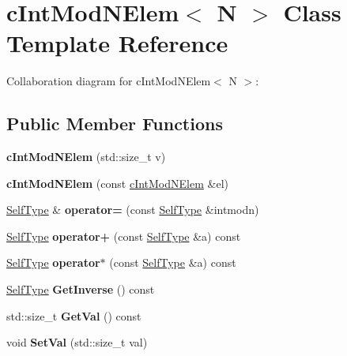 \hypertarget{classcIntModNElem}{\section{c\-Int\-Mod\-N\-Elem$<$ N $>$ Class Template Reference}
\label{classcIntModNElem}
}


Collaboration diagram for c\-Int\-Mod\-N\-Elem$<$ N $>$\-:
\subsection*{Public Member Functions}
\begin{DoxyCompactItemize}
\item 
\hypertarget{classcIntModNElem_a93be93aa382c5501b0f36322b24e93db}{{\bfseries c\-Int\-Mod\-N\-Elem} (std\-::size\-\_\-t v)}\label{classcIntModNElem_a93be93aa382c5501b0f36322b24e93db}

\item 
\hypertarget{classcIntModNElem_a878192260976d100695404d0bbc28484}{{\bfseries c\-Int\-Mod\-N\-Elem} (const \hyperlink{classcIntModNElem}{c\-Int\-Mod\-N\-Elem} \&el)}\label{classcIntModNElem_a878192260976d100695404d0bbc28484}

\item 
\hypertarget{classcIntModNElem_a0d0ae718c816556da6fcbf19454c676d}{\hyperlink{classcIntModNElem}{Self\-Type} \& {\bfseries operator=} (const \hyperlink{classcIntModNElem}{Self\-Type} \&intmodn)}\label{classcIntModNElem_a0d0ae718c816556da6fcbf19454c676d}

\item 
\hypertarget{classcIntModNElem_a10093e22457346b333e45f1414739497}{\hyperlink{classcIntModNElem}{Self\-Type} {\bfseries operator+} (const \hyperlink{classcIntModNElem}{Self\-Type} \&a) const }\label{classcIntModNElem_a10093e22457346b333e45f1414739497}

\item 
\hypertarget{classcIntModNElem_adff6836b0b7a20c50b6b9696aea66ca6}{\hyperlink{classcIntModNElem}{Self\-Type} {\bfseries operator$\ast$} (const \hyperlink{classcIntModNElem}{Self\-Type} \&a) const }\label{classcIntModNElem_adff6836b0b7a20c50b6b9696aea66ca6}

\item 
\hypertarget{classcIntModNElem_a641e400e55b454c2832262eabc8442b6}{\hyperlink{classcIntModNElem}{Self\-Type} {\bfseries Get\-Inverse} () const }\label{classcIntModNElem_a641e400e55b454c2832262eabc8442b6}

\item 
\hypertarget{classcIntModNElem_ad584ee8c4e7e57a16963e6cb5cd73c6d}{std\-::size\-\_\-t {\bfseries Get\-Val} () const }\label{classcIntModNElem_ad584ee8c4e7e57a16963e6cb5cd73c6d}

\item 
\hypertarget{classcIntModNElem_ac5d61d5866718ab5062d5030ac44b49e}{void {\bfseries Set\-Val} (std\-::size\-\_\-t val)}\label{classcIntModNElem_ac5d61d5866718ab5062d5030ac44b49e}

\end{DoxyCompactItemize}
